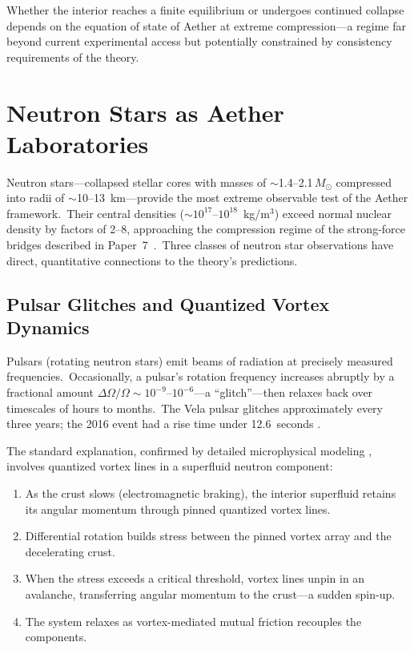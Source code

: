 ﻿\documentclass[12pt,letterpaper]{article}
\begin{document}
Whether the interior reaches a finite equilibrium or undergoes continued collapse depends
on the equation of state of Aether at extreme compression---a regime far beyond current
experimental access but potentially constrained by consistency requirements of the theory.




\section{Neutron Stars as Aether Laboratories}
\label{sec:neutron-stars}

Neutron stars---collapsed stellar cores with masses of $\sim$1.4--2.1\,$M_\odot$
compressed into radii of $\sim$10--13~km---provide the most extreme observable
test of the Aether framework.\ Their central densities ($\sim 10^{17}$--$10^{18}$~kg/m$^3$)
exceed normal nuclear density by factors of 2--8, approaching the compression
regime of the strong-force bridges described in Paper~7~\cite{otto-quantum}.\
Three classes of neutron star observations have direct, quantitative connections
to the theory's predictions.


\subsection{Pulsar Glitches and Quantized Vortex Dynamics}

Pulsars (rotating neutron stars) emit beams of radiation at precisely measured
frequencies.\ Occasionally, a pulsar's rotation frequency increases abruptly by
a fractional amount $\Delta\Omega/\Omega \sim 10^{-9}$--$10^{-6}$---a ``glitch''---then
relaxes back over timescales of hours to months.\ The Vela pulsar glitches
approximately every three years; the 2016 event had a rise time under 12.6~seconds
\cite{palfreyman2018,ashton2019}.

The standard explanation, confirmed by detailed microphysical modeling
\cite{antonelli2025}, involves quantized vortex lines in a superfluid neutron
component:

\begin{enumerate}[leftmargin=2em]
  \item As the crust slows (electromagnetic braking), the interior superfluid
    retains its angular momentum through pinned quantized vortex lines.
  \item Differential rotation builds stress between the pinned vortex array and
    the decelerating crust.
  \item When the stress exceeds a critical threshold, vortex lines unpin in an
    avalanche, transferring angular momentum to the crust---a sudden spin-up.
  \item The system relaxes as vortex-mediated mutual friction recouples the
    components.
\end{enumerate}
\end{document}
